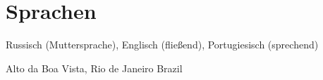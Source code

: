 \documentclass[11pt,a4paper,sans]{moderncv}        %
\begin{document}
		
		
		
		
		\section{Sprachen}
		Russisch (Muttersprache), Englisch (fließend), Portugiesisch (sprechend)
		
		\vspace*{\fill}
		\name{}{}
		\title{}
		\address{R. João Borges, 240 - casa 22}{Alto da Boa Vista, Rio de Janeiro}{ Brazil }
		\makecvtitle
	
\end{document}

